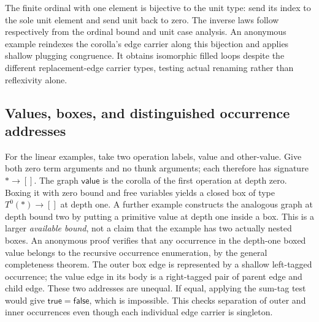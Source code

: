 The finite ordinal with one element is bijective to the unit type: send its
index to the sole unit element and send unit back to zero. The inverse laws
follow respectively from the ordinal bound and unit case analysis. An anonymous
example reindexes the corolla's edge carrier along this bijection and applies
shallow plugging congruence. It obtains isomorphic filled loops despite the
different replacement-edge carrier types, testing actual renaming rather than
reflexivity alone.

\subsection{Values, boxes, and distinguished occurrence addresses}
For the linear examples, take two operation labels, value and other-value. Give
both zero term arguments and no thunk arguments; each therefore has signature
$*\to []$. The graph $\mathsf{value}$ is the corolla of the first operation at
depth zero.
Boxing it with zero bound and free variables yields a closed box of type
$T^0(*)\to []$ at depth one. A further example constructs the analogous graph
at depth bound two by putting a primitive value at depth one inside a box.
This is a larger \emph{available bound}, not a claim that the example has two
actually nested boxes.
An anonymous proof verifies that any occurrence in the depth-one boxed value
belongs to the recursive occurrence enumeration, by the general completeness
theorem. The outer box edge is represented by a shallow left-tagged occurrence;
the value edge in its body is a right-tagged pair of parent edge and child edge.
These two addresses are unequal. If equal, applying the sum-tag test would give
$\mathsf{true}=\mathsf{false}$, which is impossible. This checks separation of
outer and inner occurrences even though each individual edge carrier is singleton.

